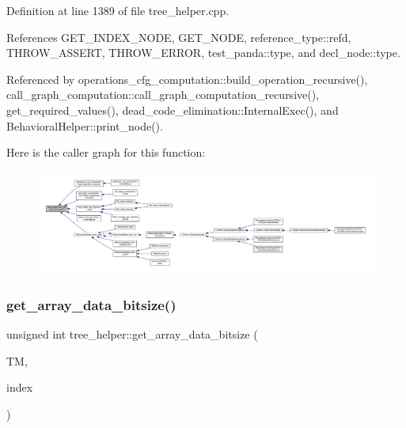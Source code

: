 Definition at line 1389 of file tree\+\_\+helper.\+cpp.



References G\+E\+T\+\_\+\+I\+N\+D\+E\+X\+\_\+\+N\+O\+DE, G\+E\+T\+\_\+\+N\+O\+DE, reference\+\_\+type\+::refd, T\+H\+R\+O\+W\+\_\+\+A\+S\+S\+E\+RT, T\+H\+R\+O\+W\+\_\+\+E\+R\+R\+OR, test\+\_\+panda\+::type, and decl\+\_\+node\+::type.



Referenced by operations\+\_\+cfg\+\_\+computation\+::build\+\_\+operation\+\_\+recursive(), call\+\_\+graph\+\_\+computation\+::call\+\_\+graph\+\_\+computation\+\_\+recursive(), get\+\_\+required\+\_\+values(), dead\+\_\+code\+\_\+elimination\+::\+Internal\+Exec(), and Behavioral\+Helper\+::print\+\_\+node().

Here is the caller graph for this function\+:
\nopagebreak
\begin{figure}[H]
\begin{center}
\leavevmode
\includegraphics[width=350pt]{d7/d99/classtree__helper_aa07e69b5707ad88e124dafaa12706804_icgraph}
\end{center}
\end{figure}
\mbox{\label{classtree__helper_a635d8a2cd09d3eb8b3453ee8b608c21a}} 
\subsubsection{\texorpdfstring{get\+\_\+array\+\_\+data\+\_\+bitsize()}{get\_array\_data\_bitsize()}}
{\footnotesize\ttfamily unsigned int tree\+\_\+helper\+::get\+\_\+array\+\_\+data\+\_\+bitsize (\begin{DoxyParamCaption}\item[{const \hyperlink{tree__manager_8hpp_a792e3f1f892d7d997a8d8a4a12e39346}{tree\+\_\+manager\+Const\+Ref} \&}]{TM,  }\item[{const unsigned int}]{index }\end{DoxyParamCaption})\hspace{0.3cm}{\ttfamily [static]}}



